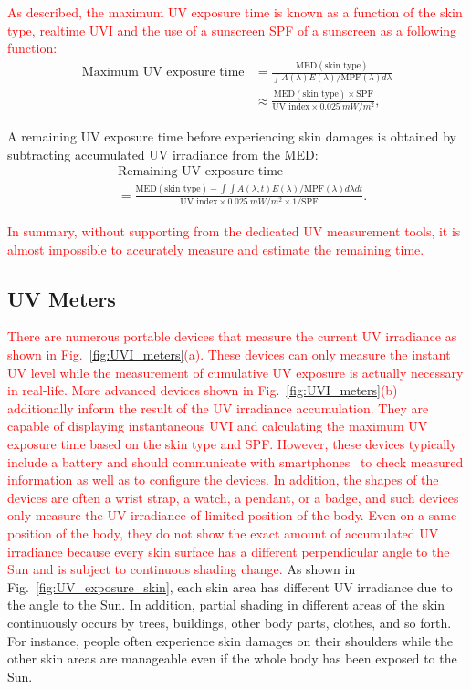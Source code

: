 \documentclass[journal]{IEEEtran}
\begin{document}
\textcolor{red}{As described, the maximum UV exposure time is known as a function of the skin type, realtime UVI and the use of a sunscreen SPF of a sunscreen as a following function:}
%
\begin{equation} \label{eq: max_exp_time}
\begin{split}
\text{Maximum~UV~exposure~time}
&= \frac{\text{MED}(\text{skin~type})}{\int A(\lambda)E(\lambda)  / \text{MPF}(\lambda) d \lambda} \\
&\approx \frac{\text{MED}(\text{skin~type})\times \text{SPF}}{\text{UV~index} \times 0.025~mW/m^2},
\end{split}
\end{equation}

A remaining UV exposure time before experiencing skin damages is obtained by subtracting accumulated UV irradiance from the MED:
%
\begin{equation}
\begin{split}
&\text{Remaining~UV~exposure~time} \\
&= \frac{\text{MED}(\text{skin~type}) - \int \int A(\lambda, t)E(\lambda) / \text{MPF}(\lambda) d \lambda dt}{\text{UV~index} \times 0.025~mW/m^2 \times 1/\text{SPF}}.
\end{split}
\end{equation}

\textcolor{red}{In summary, without supporting from the dedicated UV measurement tools, it is almost impossible to accurately measure and estimate the remaining time.}


\subsection{UV Meters}
\textcolor{red}{There are numerous portable devices that measure the current UV irradiance as shown in Fig.~\ref{fig:UVI_meters}(a).
These devices can only measure the instant UV level while the measurement of cumulative UV exposure is actually necessary in real-life. More advanced devices shown in Fig.~\ref{fig:UVI_meters}(b) additionally inform the result of the UV irradiance accumulation. They are capable of displaying instantaneous UVI and calculating the maximum UV exposure time based on the skin type and SPF.
However, these devices typically include a battery and should communicate with smartphones~\cite{Netatmo, Ultra} to check measured information as well as to configure the devices. In addition, the shapes of the devices are often a wrist strap, a watch, a pendant, or a badge, and such devices only measure the UV irradiance of limited position of the body. Even on a same position of the body, they do not show the exact amount of accumulated UV irradiance because every skin surface has a different perpendicular angle to the Sun and is subject to continuous shading change.}
%
As shown in Fig.~\ref{fig:UV_exposure_skin}, each skin area has different UV irradiance due to the angle to the Sun.
In addition, partial shading in different areas of the skin continuously occurs by trees, buildings, other body parts, clothes, and so forth. For instance, people often experience skin damages on their shoulders while the other skin areas are manageable even if the whole body has been exposed to the Sun.
\end{document}
